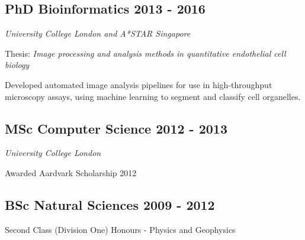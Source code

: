 \subsection{PhD Bioinformatics \hfill 2013 - 2016}
\textsl{University College London and A*STAR Singapore}
\begin{list2}
    \item Thesis: \emph{Image processing and analysis methods in quantitative endothelial cell biology}
    \item Developed automated image analysis pipelines for use in high-throughput microscopy assays, using machine learning to segment and classify cell organelles.
\end{list2}

\subsection{MSc Computer Science \hfill 2012 - 2013}
\textsl{University College London}
\begin{list2}
    \item Awarded Aardvark Scholarship 2012
\end{list2}

\subsection{BSc Natural Sciences \hfill 2009 - 2012}
\begin{list2}
    \item Second Class (Division One) Honours - Physics and Geophysics
\end{list2}

